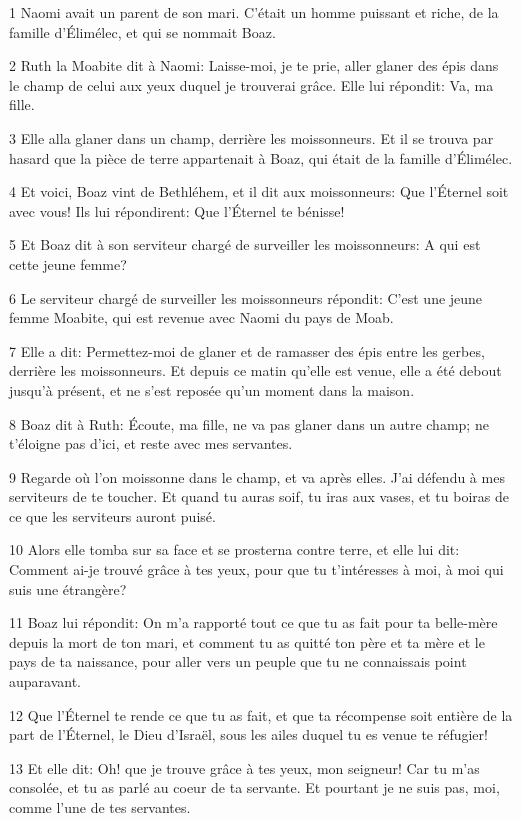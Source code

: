 \par 1 Naomi avait un parent de son mari. C'était un homme puissant et riche, de la famille d'Élimélec, et qui se nommait Boaz.
\par 2 Ruth la Moabite dit à Naomi: Laisse-moi, je te prie, aller glaner des épis dans le champ de celui aux yeux duquel je trouverai grâce. Elle lui répondit: Va, ma fille.
\par 3 Elle alla glaner dans un champ, derrière les moissonneurs. Et il se trouva par hasard que la pièce de terre appartenait à Boaz, qui était de la famille d'Élimélec.
\par 4 Et voici, Boaz vint de Bethléhem, et il dit aux moissonneurs: Que l'Éternel soit avec vous! Ils lui répondirent: Que l'Éternel te bénisse!
\par 5 Et Boaz dit à son serviteur chargé de surveiller les moissonneurs: A qui est cette jeune femme?
\par 6 Le serviteur chargé de surveiller les moissonneurs répondit: C'est une jeune femme Moabite, qui est revenue avec Naomi du pays de Moab.
\par 7 Elle a dit: Permettez-moi de glaner et de ramasser des épis entre les gerbes, derrière les moissonneurs. Et depuis ce matin qu'elle est venue, elle a été debout jusqu'à présent, et ne s'est reposée qu'un moment dans la maison.
\par 8 Boaz dit à Ruth: Écoute, ma fille, ne va pas glaner dans un autre champ; ne t'éloigne pas d'ici, et reste avec mes servantes.
\par 9 Regarde où l'on moissonne dans le champ, et va après elles. J'ai défendu à mes serviteurs de te toucher. Et quand tu auras soif, tu iras aux vases, et tu boiras de ce que les serviteurs auront puisé.
\par 10 Alors elle tomba sur sa face et se prosterna contre terre, et elle lui dit: Comment ai-je trouvé grâce à tes yeux, pour que tu t'intéresses à moi, à moi qui suis une étrangère?
\par 11 Boaz lui répondit: On m'a rapporté tout ce que tu as fait pour ta belle-mère depuis la mort de ton mari, et comment tu as quitté ton père et ta mère et le pays de ta naissance, pour aller vers un peuple que tu ne connaissais point auparavant.
\par 12 Que l'Éternel te rende ce que tu as fait, et que ta récompense soit entière de la part de l'Éternel, le Dieu d'Israël, sous les ailes duquel tu es venue te réfugier!
\par 13 Et elle dit: Oh! que je trouve grâce à tes yeux, mon seigneur! Car tu m'as consolée, et tu as parlé au coeur de ta servante. Et pourtant je ne suis pas, moi, comme l'une de tes servantes.
